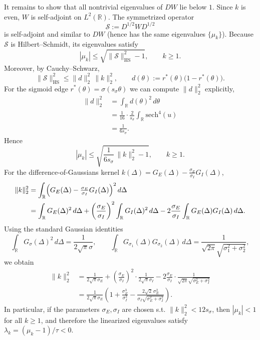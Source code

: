 \documentclass{article}
\begin{document}
It remains to show that all nontrivial eigenvalues of $DW$ lie below $1$.
Since $k$ is even, $W$ is self-adjoint on $L^2(\mathbb{R})$. The symmetrized operator
\begin{equation}
    \mathcal{S}:=D^{1/2}WD^{1/2}
\end{equation}
is self-adjoint and similar to $DW$ (hence has the same eigenvalues $\{\mu_k\}$).
Because $\mathcal{S}$ is Hilbert--Schmidt, its eigenvalues satisfy
\begin{equation}\label{eq:mu_hs_bound}
    |\mu_k| \le \sqrt{\|\mathcal{S}\|_{\mathrm{HS}}^2 - 1},\qquad k\ge 1.
\end{equation}
Moreover, by Cauchy--Schwarz,
\begin{equation}
    \|\mathcal{S}\|_{\mathrm{HS}}^2 \le \|d\|_2^2\,\|k\|_2^2,
    \qquad d(\theta):=r^*(\theta)\bigl(1-r^*(\theta)\bigr).
\end{equation}
For the sigmoid edge $r^*(\theta)=\sigma(s_{\sigma}\theta)$ we can compute $\|d\|_2^2$ explicitly,
\begin{align}
    \|d\|_2^2
    &= \int_{\mathbb{R}} d(\theta)^2\,d\theta\\
    &= \frac{1}{16}\cdot\frac{2}{s_{\sigma}}\int_{\mathbb{R}} \mathrm{sech}^4(u)\\
    &= \frac{1}{6s_{\sigma}}.
\end{align}
Hence
\begin{equation}
    |\mu_k| \le \sqrt{\frac{1}{6s_{\sigma}}\,\|k\|_2^2 - 1},\qquad k\ge 1.
\end{equation}
For the difference-of-Gaussians kernel $k(\Delta)=G_E(\Delta)-\frac{\sigma_E}{\sigma_I}G_I(\Delta)$,
\begin{align}
    \|k\|_2^2
    &= \int_{\mathbb{R}} \Bigl(G_E(\Delta)-\tfrac{\sigma_E}{\sigma_I}G_I(\Delta)\Bigr)^2\,d\Delta \nonumber\\
    &= \int_{\mathbb{R}} G_E(\Delta)^2\,d\Delta
    + \left(\frac{\sigma_E}{\sigma_I}\right)^2\int_{\mathbb{R}} G_I(\Delta)^2\,d\Delta
    - 2\frac{\sigma_E}{\sigma_I}\int_{\mathbb{R}} G_E(\Delta)G_I(\Delta)\,d\Delta. \label{eq:k_l2_exact}
\end{align}
Using the standard Gaussian identities
\begin{equation}
    \int_{\mathbb{R}} G_{\sigma}(\Delta)^2\,d\Delta = \frac{1}{2\sqrt{\pi}\sigma},
    \qquad
    \int_{\mathbb{R}} G_{\sigma_1}(\Delta)G_{\sigma_2}(\Delta)\,d\Delta = \frac{1}{\sqrt{2\pi}\sqrt{\sigma_1^2+\sigma_2^2}},
\end{equation}
we obtain
\begin{align}
    \|k\|_2^2
    &= \frac{1}{2\sqrt{\pi}\sigma_E}
    + \left(\frac{\sigma_E}{\sigma_I}\right)^2\cdot\frac{1}{2\sqrt{\pi}\sigma_I}
    - 2\frac{\sigma_E}{\sigma_I}\cdot\frac{1}{\sqrt{2\pi}\sqrt{\sigma_E^2+\sigma_I^2}}\\
    &= \frac{1}{2\sqrt{\pi}\sigma_E}\left(1+\frac{\sigma_E^3}{\sigma_I^3}-\frac{2\sqrt{2}\,\sigma_E^2}{\sigma_I\sqrt{\sigma_E^2+\sigma_I^2}}\right).
\end{align}
In particular, if the parameters $\sigma_E, \sigma_I$ are chosen s.t. $\|k\|_2^2<12s_{\sigma}$, then $|\mu_k|<1$ for all $k\ge 1$, and therefore the linearized eigenvalues satisfy $\lambda_k=(\mu_k-1)/\tau<0$.
\end{document}
